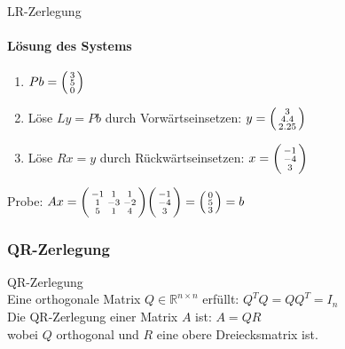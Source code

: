 \begin{example2}{LR-Zerlegung}
\paragraph{Lösung des Systems}
\begin{enumerate}
    \item $Pb = \begin{psmallmatrix} 3\\ 5\\ 0 \end{psmallmatrix}$
    \item Löse $Ly = Pb$ durch Vorwärtseinsetzen:
    $y = \begin{psmallmatrix} 3\\ 4.4\\ 2.25 \end{psmallmatrix}$
    \item Löse $Rx = y$ durch Rückwärtseinsetzen:
    $x = \begin{psmallmatrix} -1\\ -4\\ 3 \end{psmallmatrix}$
\end{enumerate}

Probe:
$Ax = \begin{psmallmatrix}
-1 & 1 & 1\\
1 & -3 & -2\\
5 & 1 & 4
\end{psmallmatrix} \begin{psmallmatrix} -1\\ -4\\ 3 \end{psmallmatrix} = \begin{psmallmatrix} 0\\ 5\\ 3 \end{psmallmatrix} = b$
\end{example2}

\columnbreak

\subsubsection{QR-Zerlegung}

\begin{concept}{QR-Zerlegung}\\
Eine orthogonale Matrix $Q \in \mathbb{R}^{n\times n}$ erfüllt: $Q^T Q = QQ^T = I_n$
\vspace{1mm}\\
Die QR-Zerlegung einer Matrix $A$ ist: $A = QR$
\vspace{1mm}\\
wobei $Q$ orthogonal und $R$ eine obere Dreiecksmatrix ist.
\end{concept}

